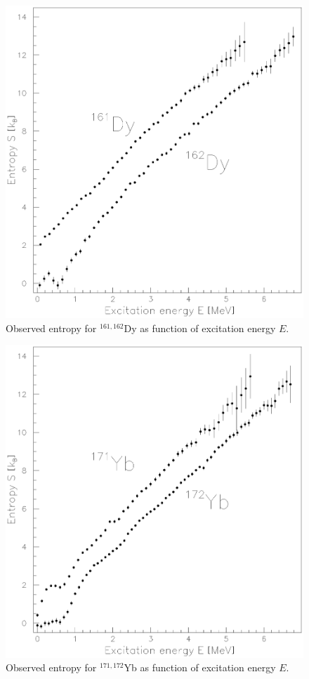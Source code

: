 \begin{figure}
\includegraphics[totalheight=19cm,angle=0,bb=0 20 350 730]{fig7.ps}
\caption{Observed entropy for $^{161,162}$Dy as function of excitation energy $E$.}
\label{fig:fig7}
\end{figure}

\begin{figure}
\includegraphics[totalheight=19cm,angle=0,bb=0 20 350 730]{fig8.ps}
\caption{Observed entropy for $^{171,172}$Yb as function of excitation energy $E$.}
\label{fig:fig8}
\end{figure}

